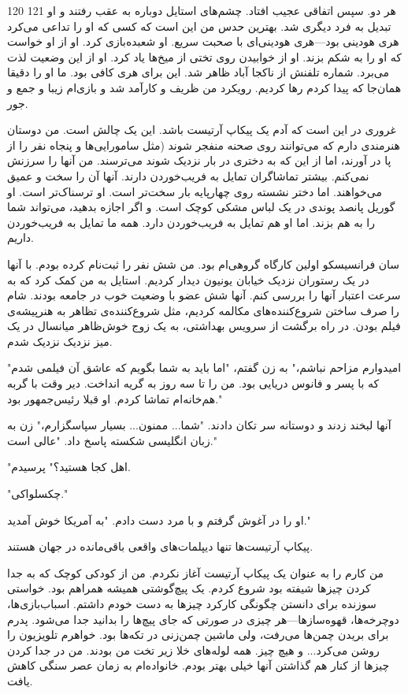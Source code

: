 120 121
هر دو. سپس اتفاقی عجیب افتاد. چشم‌های استایل دوباره به عقب رفتند و او تبدیل به فرد دیگری شد. بهترین حدس من این است که کسی که او را تداعی می‌کرد هری هودینی بود—هری هودینی‌ای با صحبت سریع. او شعبده‌بازی کرد. او از او خواست که او را به شکم بزند. او از خوابیدن روی تختی از میخ‌ها یاد کرد. او از این وضعیت لذت می‌برد. شماره تلفنش از ناکجا آباد ظاهر شد. این برای هری کافی بود. ما او را دقیقا همان‌جا که پیدا کردم رها کردیم. رویکرد من ظریف و کارآمد شد و بازی‌ام زیبا و جمع و جور.

غروری در این است که آدم یک پیکاپ آرتیست باشد. این یک چالش است. من دوستان هنرمندی دارم که می‌توانند روی صحنه منفجر شوند (مثل سامورایی‌ها و پنجاه نفر را از پا در آورند، اما از این که به دختری در بار نزدیک شوند می‌ترسند. من آنها را سرزنش نمی‌کنم. بیشتر تماشاگران تمایل به فریب‌خوردن دارند. آنها آن را سخت و عمیق می‌خواهند. اما دختر نشسته روی چهارپایه بار سخت‌تر است. او ترسناک‌تر است. او گوریل پانصد پوندی در یک لباس مشکی کوچک است. و اگر اجازه بدهید، می‌تواند شما را به هم بزند. اما او هم تمایل به فریب‌خوردن دارد. همه ما تمایل به فریب‌خوردن داریم.

سان فرانسیسکو اولین کارگاه گروهی‌ام بود. من شش نفر را ثبت‌نام کرده‌ بودم. با آنها در یک رستوران نزدیک خیابان یونیون دیدار کردیم. استایل به من کمک کرد که به سرعت اعتبار آنها را بررسی کنم. آنها شش عضو با وضعیت خوب در جامعه بودند. شام را صرف ساختن شروع‌کننده‌های مکالمه کردیم، مثل شروع‌کننده‌ی تظاهر به هنرپیشه‌ی فیلم بودن. در راه برگشت از سرویس بهداشتی، به یک زوج خوش‌ظاهر میانسال در یک میز نزدیک نزدیک شدم.

"امیدوارم مزاحم نباشم،" به زن گفتم، "اما باید به شما بگویم که عاشق آن فیلمی شدم که با پسر و فانوس دریایی بود. من را تا سه روز به گریه انداخت. دیر وقت با گربه هم‌خانه‌ام تماشا کردم. او قبلا رئیس‌جمهور بود."

آنها لبخند زدند و دوستانه سر تکان دادند. "شما... ممنون... بسیار سپاسگزارم،" زن به زبان انگلیسی شکسته پاسخ داد. "عالی است."

"اهل کجا هستید؟" پرسیدم.

"چکسلواکی."

او را در آغوش گرفتم و با مرد دست دادم. "به آمریکا خوش آمدید."

پیکاپ آرتیست‌ها تنها دیپلمات‌های واقعی باقی‌مانده در جهان هستند.

من کارم را به عنوان یک پیکاپ آرتیست آغاز نکردم. من از کودکی کوچک که به جدا کردن چیزها شیفته بود شروع کردم. یک پیچ‌گوشتی همیشه همراهم بود. خواستی سوزنده برای دانستن چگونگی کارکرد چیزها به دست خودم داشتم. اسباب‌بازی‌ها، دوچرخه‌ها، قهوه‌سازها—هر چیزی در صورتی که جای پیچ‌ها را بدانید جدا می‌شود. پدرم برای بریدن چمن‌ها می‌رفت، ولی ماشین چمن‌زنی در تکه‌ها بود. خواهرم تلویزیون را روشن می‌کرد... و هیچ چیز. همه لوله‌های خلا زیر تخت من بودند. من در جدا کردن چیزها از کنار هم گذاشتن آنها خیلی بهتر بودم. خانواده‌ام به زمان عصر سنگی کاهش یافت. 

